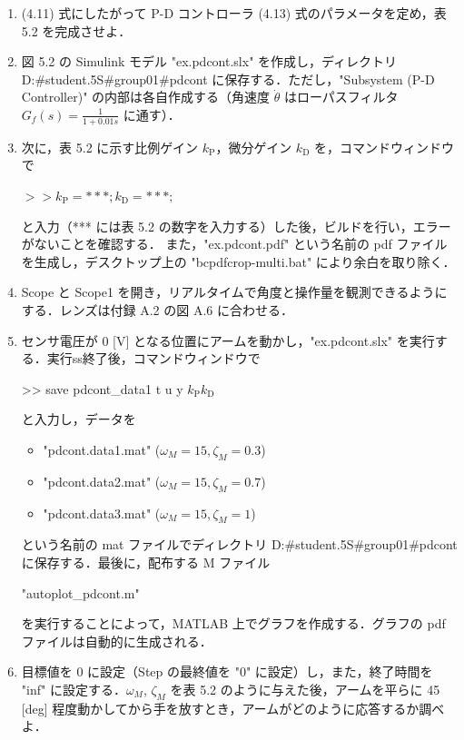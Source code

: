 \begin{enumerate}
  \item (4.11) 式にしたがって P-D コントローラ (4.13) 式のパラメータを定め，表 5.2 を完成させよ．
        
  \item 図 5.2 の Simulink モデル "ex.pdcont.slx" を作成し，ディレクトリ D:\#student.5S\#group01\#pdcont に保存する．ただし，"Subsystem (P-D Controller)" の内部は各自作成する（角速度 $\dot{\theta}$ はローパスフィルタ $G_f(s) = \frac{1}{1 + 0.01s}$ に通す）．
        
  \item 次に，表 5.2 に示す比例ゲイン $k_{\mathrm{P}}$，微分ゲイン $k_{\mathrm{D}}$ を，コマンドウィンドウで
        
        \(>> k_{\mathrm{P}} = ***; k_{\mathrm{D}} = ***;\)
        
        と入力（*** には表 5.2 の数字を入力する）した後，ビルドを行い，エラーがないことを確認する．
        また，"ex.pdcont.pdf" という名前の pdf ファイルを生成し，デスクトップ上の 
        "bcpdfcrop-multi.bat" により余白を取り除く．
        
  \item Scope と Scope1 を開き，リアルタイムで角度と操作量を観測できるようにする．レンズは付録 A.2 の図 A.6 に合わせる．
        
  \item センサ電圧が 0 [V] となる位置にアームを動かし，"ex.pdcont.slx" を実行する．実行ss終了後，コマンドウィンドウで
        
        
        >> save pdcont\_data1 t u y \(k_{\mathrm{P}} k_{\mathrm{D}}\)
        
        
        と入力し，データを
        
        \begin{itemize}
          \item "pdcont.data1.mat" ($\omega_M = 15, \zeta_M = 0.3$)
          \item "pdcont.data2.mat" ($\omega_M = 15, \zeta_M = 0.7$)
          \item "pdcont.data3.mat" ($\omega_M = 15, \zeta_M = 1$)
        \end{itemize}
        
        という名前の mat ファイルでディレクトリ D:\#student.5S\#group01\#pdcont に保存する．最後に，配布する M ファイル
        
        "autoplot\_pdcont.m"
        
        を実行することによって，MATLAB 上でグラフを作成する．グラフの pdf ファイルは自動的に生成される．
        
  \item 目標値を 0 に設定（Step の最終値を "0" に設定）し，また，終了時間を "inf" に設定する．$\omega_M$, $\zeta_M$ を表 5.2 のように与えた後，アームを平らに 45 [deg] 程度動かしてから手を放すとき，アームがどのように応答するか調べよ．
\end{enumerate}


